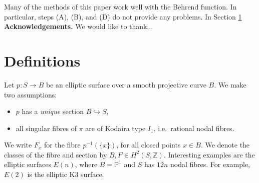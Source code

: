 \documentclass{amsart}
\theoremstyle{definition}
\newcommand{\ZZ} {\mathbb{Z}}		%
\newcommand{\PP} {\mathbb{P}}
\begin{document}
Many of the methods of this paper work well with the Behrend function. In particular, steps (A), (B), and (D) do not provide any problems. In Section \ref{}  \\

\noindent \textbf{Acknowledgements.} We would like to thank... 


\section{Definitions}

Let $p : S \rightarrow B$ be an elliptic surface over a smooth projective curve $B$. We make two assumptions:
\begin{itemize}
\item $p$ has a \emph{unique} section $B \hookrightarrow S$,
\item all singular fibres of $\pi$ are of Kodaira type $I_1$, i.e.~rational nodal fibres. 
\end{itemize}
We write $F_x$ for the fibre $p^{-1}(\{x\})$, for all closed points $x \in B$. We denote the classes of the fibre and section by $B, F \in H^2(S,\ZZ)$. Interesting examples are the elliptic surfaces $E(n)$, where $B = \PP^1$ and $S$ has $12n$ nodal fibres. For example, $E(2)$ is the elliptic K3 surface.
\end{document}
